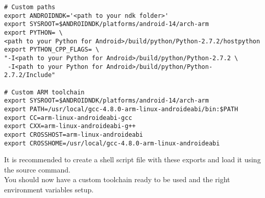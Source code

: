 	\begin{lstlisting}
# Custom paths
export ANDROIDNDK='<path to your ndk folder>'
export SYSROOT=$ANDROIDNDK/platforms/android-14/arch-arm
export PYTHON= \ 
<path to your Python for Android>/build/python/Python-2.7.2/hostpython
export PYTHON_CPP_FLAGS= \
"-I<path to your Python for Android>/build/python/Python-2.7.2 \
 -I<path to your Python for Android>/build/python/Python-2.7.2/Include"
	 
# Custom ARM toolchain
export SYSROOT=$ANDROIDNDK/platforms/android-14/arch-arm
export PATH=/usr/local/gcc-4.8.0-arm-linux-androideabi/bin:$PATH
export CC=arm-linux-androideabi-gcc
export CXX=arm-linux-androideabi-g++
export CROSSHOST=arm-linux-androideabi
export CROSSHOME=/usr/local/gcc-4.8.0-arm-linux-androideabi
	\end{lstlisting}
	It is recommended to create a shell script file with these exports and load it using the source command.\\
	You should now have a custom toolchain ready to be used and the right environment variables setup.